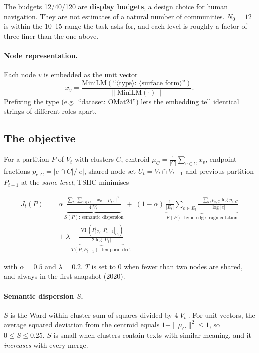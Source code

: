 \documentclass[11pt,a4paper]{article}
\theoremstyle{remark}
\newcommand{\VI}{\operatorname{VI}}
\begin{document}
The budgets 12/40/120 are \textbf{display budgets}, a design choice for human
navigation. They are not estimates of a natural number of communities. $N_0=12$ is
within the 10--15 range the task asks for, and each level is roughly a factor of three
finer than the one above.

\paragraph{Node representation.}
Each node $v$ is embedded as the unit vector
\[
x_v=\frac{\mathrm{MiniLM}(\text{``}\langle\text{type}\rangle\text{: }\langle\text{surface\_form}\rangle\text{''})}{\big\|\mathrm{MiniLM}(\cdot)\big\|}.
\]
Prefixing the type (e.g.\ ``dataset: OMat24'') lets the embedding tell identical
strings of different roles apart.

\subsection{The objective}

For a partition $P$ of $V_t$ with clusters $C$, centroid
$\mu_C=\frac1{|C|}\sum_{v\in C}x_v$, endpoint fractions $p_{e,C}=|e\cap C|/|e|$,
shared node set $U_t=V_t\cap V_{t-1}$ and previous partition $P_{t-1}$ at the
\emph{same level}, TSHC minimises

\begin{tcolorbox}[colback=soft,colframe=accent,boxrule=0.6pt,arc=2pt,left=2pt,right=2pt]
\begin{equation}
\begin{aligned}
J_t(P)={}&\alpha\,\underbrace{\frac{\sum_C\sum_{v\in C}\|x_v-\mu_C\|^2}{4|V_t|}}_{S(P)\text{: semantic dispersion}}
\;+\;(1-\alpha)\,\underbrace{\frac{1}{|E_t|}\sum_{e\in E_t}\frac{-\sum_C p_{e,C}\log p_{e,C}}{\log|e|}}_{F(P)\text{: hyperedge fragmentation}}\\[4pt]
&+\;\lambda\,\underbrace{\frac{\VI\!\left(P|_{U_t},\,P_{t-1}|_{U_t}\right)}{2\log|U_t|}}_{T(P,P_{t-1})\text{: temporal drift}}
\end{aligned}
\label{eq:objective}
\end{equation}
\end{tcolorbox}

\noindent with $\alpha=0.5$ and $\lambda=0.2$. $T$ is set to $0$ when fewer than two
nodes are shared, and always in the first snapshot (2020).

\paragraph{Semantic dispersion $S$.}
$S$ is the Ward within-cluster sum of squares divided by $4|V_t|$. For unit vectors,
the average squared deviation from the centroid equals $1-\|\mu_C\|^2\le1$, so
$0\le S\le 0.25$. $S$ is small when clusters contain texts with similar meaning, and it
\emph{increases} with every merge.
\end{document}
